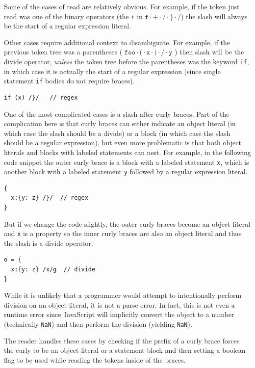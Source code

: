 \documentclass[preprint,10pt]{sigplanconf}
\begin{document}
Some of the cases of read are relatively obvious. For example, if the
token just read was one of the binary operators (\eg the \texttt{+} in
\(\texttt{f} \cdot \texttt{+} \cdot \texttt{/} 
\cdot \texttt{\}} \cdot \texttt{/}
\)) the slash will always be the start of a regular expression
literal. 

Other cases require additional context to disambiguate. For example,
if the previous token tree was a parentheses (\eg 
\(
\texttt{foo} \cdot \texttt{(} \cdot \texttt{x} \cdot \texttt{)} \cdot \texttt{/} \cdot \texttt{y}
\)
) then slash will be the divide
operator, \emph{unless} the token tree before the parentheses was the
keyword \texttt{if}, in which case it is actually the start of a
regular expression (since single statement \texttt{if} bodies do not require
braces).

\begin{lstlisting}
if (x) /}/   // regex
\end{lstlisting}

One of the most complicated cases is a slash after curly braces. Part
of the complication here is that curly braces can either indicate an
object literal (in which case the slash should be a divide) or a block
(in which case the slash should be a regular expression), but even
more problematic is that both object literals and blocks with labeled
statements can nest. For example, in the following code snippet the
outer curly brace is a block with a labeled statement \verb!x!, which
is another block with a labeled statement \verb!y! followed by a
regular expression literal.
\begin{lstlisting}
{
  x:{y: z} /}/  // regex
}
\end{lstlisting}

But if we change the code slightly, the outer curly braces become an
object literal and \verb!x! is a property so the inner curly
braces are also an object literal and thus the slash is a divide operator.

\begin{lstlisting}
o = {
  x:{y: z} /x/g  // divide
}
\end{lstlisting}

While it is unlikely that a programmer would attempt to intentionally
perform division on an object literal, it is not a parse error. In
fact, this is not even a runtime error since JavaScript will
implicitly convert the object to a number (technically
\verb!NaN!) and then perform the division (yielding
\verb!NaN!).

The reader handles these cases by checking if the prefix of a curly
brace forces the curly to be an object literal or a statement
block and then setting a boolean flag to be used while reading the
tokens inside of the braces.
\end{document}

